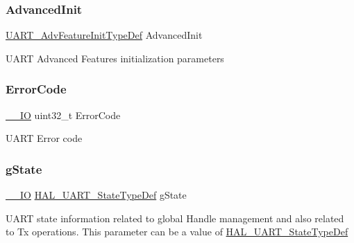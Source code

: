 \subsubsection{\texorpdfstring{Advanced\+Init}{AdvancedInit}}
{\footnotesize\ttfamily \hyperlink{struct_u_a_r_t___adv_feature_init_type_def}{U\+A\+R\+T\+\_\+\+Adv\+Feature\+Init\+Type\+Def} Advanced\+Init}

U\+A\+RT Advanced Features initialization parameters \mbox{\label{struct_u_a_r_t___handle_type_def_a123c5063e6a3b1901b2fbe5f88c53a7e}} 
\subsubsection{\texorpdfstring{Error\+Code}{ErrorCode}}
{\footnotesize\ttfamily \hyperlink{core__sc300_8h_aec43007d9998a0a0e01faede4133d6be}{\+\_\+\+\_\+\+IO} uint32\+\_\+t Error\+Code}

U\+A\+RT Error code \mbox{\label{struct_u_a_r_t___handle_type_def_ab596705b6ce037e8debc149ccee148da}} 
\subsubsection{\texorpdfstring{g\+State}{gState}}
{\footnotesize\ttfamily \hyperlink{core__sc300_8h_aec43007d9998a0a0e01faede4133d6be}{\+\_\+\+\_\+\+IO} \hyperlink{group___u_a_r_t___exported___types_gaf55d844a35379c204c90be5d1e8e50ba}{H\+A\+L\+\_\+\+U\+A\+R\+T\+\_\+\+State\+Type\+Def} g\+State}

U\+A\+RT state information related to global Handle management and also related to Tx operations. This parameter can be a value of \hyperlink{group___u_a_r_t___exported___types_gaf55d844a35379c204c90be5d1e8e50ba}{H\+A\+L\+\_\+\+U\+A\+R\+T\+\_\+\+State\+Type\+Def} \mbox{\label{struct_u_a_r_t___handle_type_def_abd0aeec20298a55d89a440320e35634f}} 
